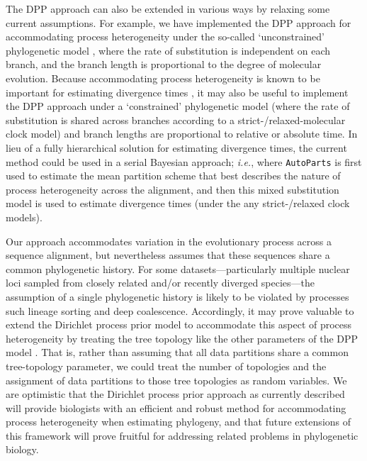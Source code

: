 \documentclass[11pt]{article}
\begin{document}
The DPP approach can also be extended in various ways by relaxing some current assumptions.
For example, we have implemented the DPP approach for accommodating process heterogeneity under the so-called `unconstrained' phylogenetic model \citep[{\it e.g.},][]{Heath14}, where the rate of substitution is independent on each branch, and the branch length is proportional to the degree of molecular evolution.
Because accommodating process heterogeneity is known to be important for estimating divergence times \citep[{\it e.g.},][]{marshall06,poux08,vendetti08}, it may also be useful to implement the DPP approach under a `constrained' phylogenetic model (where the rate of substitution is shared across branches according to a strict-/relaxed-molecular clock model) and branch lengths are proportional to relative or absolute time. 
In lieu of a fully hierarchical solution for estimating divergence times, the current method could be used in a serial Bayesian approach; {\it i.e.}, where \verb!AutoParts! is first used to estimate the mean partition scheme that best describes the nature of process heterogeneity across the alignment, and then this mixed substitution model is used to estimate divergence times (under the any strict-/relaxed clock models). 

Our approach accommodates variation in the evolutionary process across a sequence alignment, but nevertheless assumes that these sequences share a common phylogenetic history. 
For some datasets---particularly multiple nuclear loci sampled from closely related and/or recently diverged species---the assumption of a single phylogenetic history is likely to be violated by processes such lineage sorting and deep coalescence.  
Accordingly, it may prove valuable to extend the Dirichlet process prior model to accommodate this aspect of process heterogeneity by treating the tree topology like the other parameters of the DPP model \citep[\emph{c.f.}, ][]{ane07}.  
That is, rather than assuming that all data partitions share a common tree-topology parameter, we could treat the number of topologies and the assignment of data partitions to those tree topologies as random variables.  
We are optimistic that the Dirichlet process prior approach as currently described will provide biologists with an efficient and robust method for accommodating process heterogeneity when estimating phylogeny, and that future extensions of this framework will prove fruitful for addressing related problems in phylogenetic biology.

\bigskip
\end{document}
